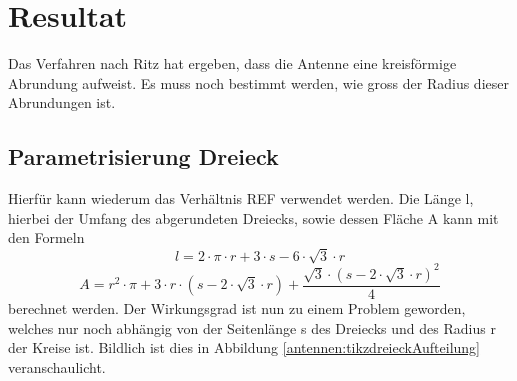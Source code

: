 %
%
% 
%
%

\section{Resultat\label{antennen:resultat}}

Das Verfahren nach Ritz hat ergeben, dass die Antenne eine kreisförmige Abrundung aufweist. 
Es muss noch bestimmt werden, wie gross der Radius dieser Abrundungen ist. 

\subsection{Parametrisierung Dreieck\label{antennen:param3eck}}
Hierfür kann wiederum das Verhältnis REF verwendet werden. Die Länge l, hierbei der Umfang 
des abgerundeten Dreiecks, sowie dessen Fläche A kann mit den Formeln
\begin{equation}
	l=2\cdot{\pi}\cdot{r}+3\cdot{s}-6\cdot{\sqrt{3}}\cdot{r}
	\label{antennen:Länge}
\end{equation}
\begin{equation}
	A=r^2\cdot{\pi}+3\cdot{r}\cdot{(s-2\cdot{\sqrt{3}}\cdot{r})}+\frac{\sqrt{3}\cdot{(s-2\cdot{\sqrt{3}}\cdot{r})^2}}{4}
	\label{antennen:Fläche}
\end{equation}
berechnet werden.
Der Wirkungsgrad ist nun zu einem Problem geworden, welches nur noch abhängig von 
der Seitenlänge s des Dreiecks und des Radius r der Kreise ist. Bildlich ist dies 
in Abbildung \ref{antennen:tikzdreieckAufteilung} veranschaulicht.

